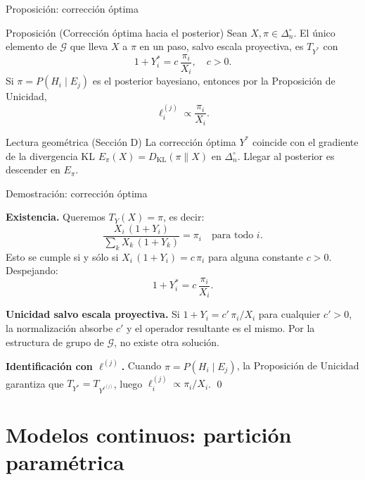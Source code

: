 \documentclass[12pt, aspectratio=169]{beamer}
\newcommand{\Dni}{\Delta_n^\circ}
\begin{document}
\begin{frame}{Proposición: corrección óptima}

  \begin{alertblock}{Proposición (Corrección óptima hacia el posterior)}
    Sean $X, \pi \in \Dni$. El único elemento de $\mathcal{G}$
    que lleva $X$ a $\pi$ en un paso, salvo escala proyectiva, es $T_{Y^*}$ con
    \[
      1 + Y_i^* = c\,\frac{\pi_i}{X_i}, \quad c > 0.
    \]
    Si $\pi = P(H_i \mid E_j)$ es el posterior bayesiano,
    entonces por la Proposición de Unicidad,
    \[
      \ell_i^{(j)} \propto \frac{\pi_i}{X_i}.
    \]
  \end{alertblock}

  \vspace{6pt}
  \begin{block}{Lectura geométrica (Sección D)}
    La corrección óptima $Y^*$ coincide con el gradiente de la divergencia KL
    $E_\pi(X) = D_{\mathrm{KL}}(\pi \| X)$ en $\Dni$.
    Llegar al posterior es descender en $E_\pi$.
  \end{block}
\end{frame}

\begin{frame}{Demostración: corrección óptima}

  \textbf{Existencia.}
  Queremos $T_Y(X) = \pi$, es decir:
  \[
    \frac{X_i\,(1+Y_i)}{\displaystyle\sum_{k} X_k\,(1+Y_k)} = \pi_i
    \quad \text{para todo } i.
  \]
  Esto se cumple si y sólo si $X_i\,(1+Y_i) = c\,\pi_i$ para alguna constante $c > 0$.
  Despejando:
  \[
    1 + Y_i^* = c\,\frac{\pi_i}{X_i}.
  \]

  \vspace{8pt}
  \textbf{Unicidad salvo escala proyectiva.}
  Si $1 + Y_i = c'\,\pi_i/X_i$ para cualquier $c' > 0$, la normalización absorbe $c'$
  y el operador resultante es el mismo.
  Por la estructura de grupo de $\mathcal{G}$, no existe otra solución.

  \vspace{8pt}
  \textbf{Identificación con $\ell^{(j)}$.}
  Cuando $\pi = P(H_i \mid E_j)$, la Proposición de Unicidad garantiza que
  $T_{Y^*} = T_{Y^{\ell^{(j)}}}$, luego $\ell_i^{(j)} \propto \pi_i/X_i$. \qed
\end{frame}

\section{Modelos continuos: partición paramétrica}
\end{document}
